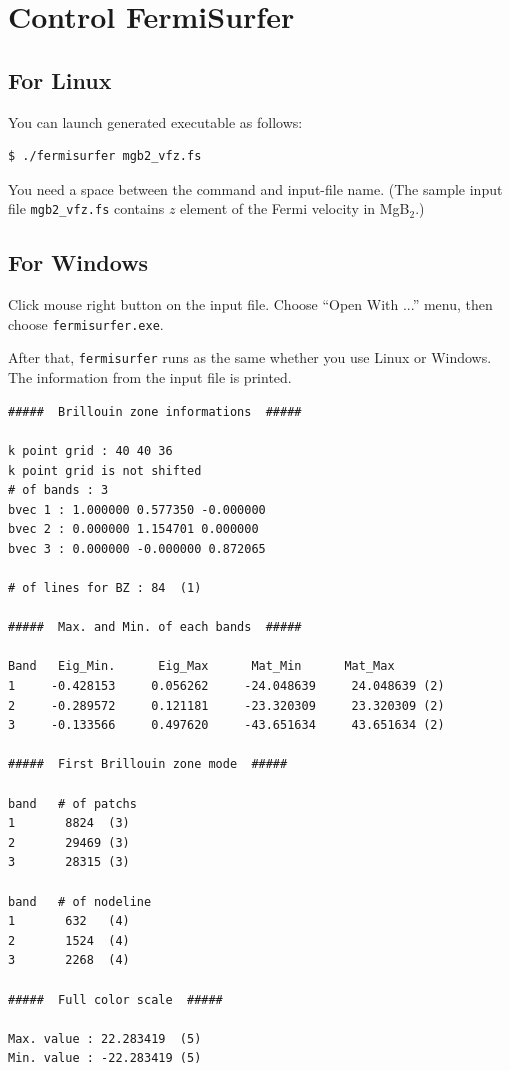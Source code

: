 \documentclass[12pt]{article}
\begin{document}
\section{Control FermiSurfer}

\subsection{For Linux}
You can launch generated executable as follows:
\begin{verbatim}
$ ./fermisurfer mgb2_vfz.fs
\end{verbatim}
You need a space between the command and input-file name.
(The sample input file \verb|mgb2_vfz.fs| contains
$z$ element of the Fermi velocity in MgB$_2$.)

\subsection{For Windows}
Click mouse right button on the input file.
Choose ``Open With ...'' menu,
then choose \verb|fermisurfer.exe|.

\vspace{0.5cm}
After that, \verb|fermisurfer| runs as the same whether you use Linux or Windows.
The information from the input file is printed.

\begin{verbatim}
#####  Brillouin zone informations  ##### 

k point grid : 40 40 36 
k point grid is not shifted 
# of bands : 3 
bvec 1 : 1.000000 0.577350 -0.000000 
bvec 2 : 0.000000 1.154701 0.000000 
bvec 3 : 0.000000 -0.000000 0.872065 

# of lines for BZ : 84  (1)

#####  Max. and Min. of each bands  ##### 
     
Band   Eig_Min.      Eig_Max      Mat_Min      Mat_Max 
1     -0.428153     0.056262     -24.048639     24.048639 (2)
2     -0.289572     0.121181     -23.320309     23.320309 (2)
3     -0.133566     0.497620     -43.651634     43.651634 (2)

#####  First Brillouin zone mode  #####

band   # of patchs
1       8824  (3)
2       29469 (3)
3       28315 (3)

band   # of nodeline 
1       632   (4)
2       1524  (4)
3       2268  (4)

#####  Full color scale  ##### 

Max. value : 22.283419  (5)
Min. value : -22.283419 (5) 

\end{verbatim}
\end{document}
